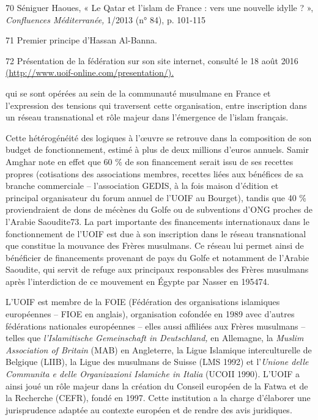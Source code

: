 70 Séniguer Haoues, « Le Qatar et l'islam de France : vers une nouvelle
idylle ? », \emph{Confluences Méditerranée,} 1/2013 (n° 84), p. 101-115

71 Premier principe d'Hassan Al-Banna.

72 Présentation de la fédération sur son site internet, consulté le 18
août 2016
\href{http://www.uoif-online.com/presentation/)}{(http://www.uoif-online.com/presentation/).}



qui se sont opérées au sein de la communauté musulmane en France et
l'expression des tensions qui traversent cette organisation, entre
inscription dans un réseau transnational et rôle majeur dans l'émergence
de l'islam français.

Cette hétérogénéité des logiques à l'œuvre se retrouve dans la
composition de son budget de fonctionnement, estimé à plus de deux
millions d'euros annuels. Samir Amghar note en effet que 60 \% de son
financement serait issu de ses recettes propres (cotisations des
associations membres, recettes liées aux bénéfices de sa branche
commerciale -- l'association GEDIS, à la fois maison d'édition et
principal organisateur du forum annuel de l'UOIF au Bourget), tandis que
40 \% proviendraient de dons de mécènes du Golfe ou de subventions d'ONG
proches de l'Arabie Saoudite73. La part importante des financements
internationaux dans le fonctionnement de l'UOIF est due à son
inscription dans le réseau transnational que constitue la mouvance des
Frères musulmans. Ce réseau lui permet ainsi de bénéficier de
financements provenant de pays du Golfe et notamment de l'Arabie
Saoudite, qui servit de refuge aux principaux responsables des Frères
musulmans après l'interdiction de ce mouvement en Égypte par Nasser en
195474.

L'UOIF est membre de la FOIE (Fédération des organisations islamiques
européennes -- FIOE en anglais), organisation cofondée en 1989 avec
d'autres fédérations nationales européennes -- elles aussi affiliées aux
Frères musulmans -- telles que \emph{l'Islamitische Gemeinschaft in
Deutschland,} en Allemagne, la \emph{Muslim Association of Britain}
(MAB) en Angleterre, la Ligue Islamique interculturelle de Belgique
(LIIB), la Ligue des musulmans de Suisse (LMS 1992) et l'\emph{Unione
delle Communita e delle Organizazioni Islamiche in Italia} (UCOII 1990).
L'UOIF a ainsi joué un rôle majeur dans la création du Conseil européen
de la Fatwa et de la Recherche (CEFR), fondé en 1997. Cette institution
a la charge d'élaborer une jurisprudence adaptée au contexte européen et
de rendre des avis juridiques.

